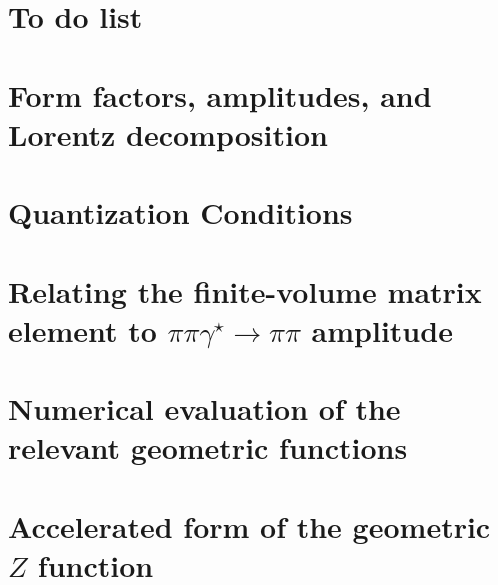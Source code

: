 \documentclass[prd,showkeys,preprintnumbers,floatfix,superscriptaddress, nofootinbib]{revtex4}
\begin{document}

\nopagebreak
\maketitle

\tableofcontents

\clearpage

\section{To do list}


\section{Form factors, amplitudes, and Lorentz decomposition}


\section{Quantization Conditions}


\section{Relating the finite-volume matrix element to $\pi\pi\gamma^\star\to\pi\pi$ amplitude \label{sec:pipigs_pipi}}


\section{Numerical evaluation of the relevant geometric functions}


\appendix

\section{Accelerated form of the geometric $Z$ function}



\clearpage

\end{document}
